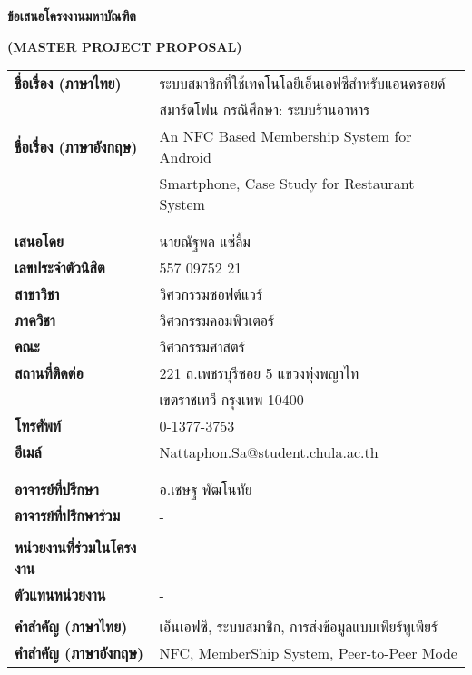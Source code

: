 \documentclass[12pt,a4paper]{article}
\begin{document}
\begin{titlepage}

\begin{center}
{\huge \bf ข้อเสนอโครงงานมหาบัณฑิต} 
\end{center}

\begin{center}
{\huge \bf (MASTER PROJECT PROPOSAL)} 
\end{center}

\vspace{1cm}
{\Large\noindent\hspace{0.0cm}\setlength{\tabcolsep}{15pt}
\begin{tabular}{l l}    
	\bf ชื่อเรื่อง (ภาษาไทย) 		& ระบบสมาชิกที่ใช้เทคโนโลยีเอ็นเอฟซีสำหรับแอนดรอยด์ \\
								& สมาร์ตโฟน กรณีศึกษา: ระบบร้านอาหาร \\
	\bf ชื่อเรื่อง (ภาษาอังกฤษ)	& An NFC Based Membership System for Android \\
								& Smartphone, Case Study for Restaurant System \\ 
								& \\
								& \\
	\bf เสนอโดย					& นายณัฐพล แซ่ลิ้ม \\
	\bf เลขประจำตัวนิสิต			& 557 09752 21 \\
	\bf สาขาวิชา					& วิศวกรรมซอฟต์แวร์ \\
	\bf ภาควิชา					& วิศวกรรมคอมพิวเตอร์ \\
	\bf คณะ						& วิศวกรรมศาสตร์ \\
	\bf สถานที่ติดต่อ				& 221 ถ.เพชรบุรีซอย 5 แขวงทุ่งพญาไท \\
								& เขตราชเทวี กรุงเทพ 10400 \\
	\bf โทรศัพท์					& 0-1377-3753 \\
	\bf อีเมล์					&  Nattaphon.Sa@student.chula.ac.th \\
								& \\
								& \\
	\bf อาจารย์ที่ปรึกษา			& อ.เชษฐ พัฒโนทัย \\
	\bf อาจารย์ที่ปรึกษาร่วม		& - \\
								& \\
	\bf หน่วยงานที่ร่วมในโครงงาน	& - \\
	\bf ตัวแทนหน่วยงาน			& - \\
								& \\
	\bf คำสำคัญ (ภาษาไทย)		& เอ็นเอฟซี, ระบบสมาชิก, การส่งข้อมูลแบบเพียร์ทูเพียร์ \\
	\bf คำสำคัญ (ภาษาอังกฤษ)		& NFC, MemberShip System, Peer-to-Peer Mode \\
\end{tabular}}

\end{titlepage}
\end{document}
